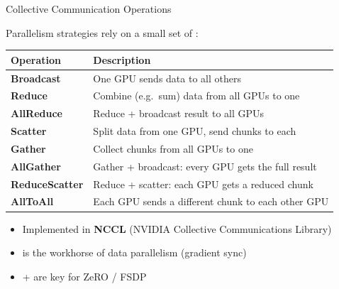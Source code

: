 \begin{frame}{Collective Communication Operations}

  Parallelism strategies rely on a small set of :

  \vspace{0.3em}
  \begin{center}
  \begin{tabular}{l p{7.5cm}}
    \toprule
    \textbf{Operation} & \textbf{Description} \\
    \midrule
    \textbf{Broadcast}       & One GPU sends data to all others \\
    \textbf{Reduce}          & Combine (e.g.\ sum) data from all GPUs to one \\
    \textbf{AllReduce}       & Reduce + broadcast result to all GPUs \\
    \textbf{Scatter}         & Split data from one GPU, send chunks to each \\
    \textbf{Gather}          & Collect chunks from all GPUs to one \\
    \textbf{AllGather}       & Gather + broadcast: every GPU gets the full result \\
    \textbf{ReduceScatter}   & Reduce + scatter: each GPU gets a reduced chunk \\
    \textbf{AllToAll}        & Each GPU sends a different chunk to each other GPU \\
    \bottomrule
  \end{tabular}
  \end{center}

  \vspace{0.3em}
  \begin{itemize}
    \item Implemented in \textbf{NCCL} (NVIDIA Collective Communications Library)
    \item {} is the workhorse of data parallelism (gradient sync)
    \item {} +  are key for ZeRO / FSDP
  \end{itemize}
\end{frame}


